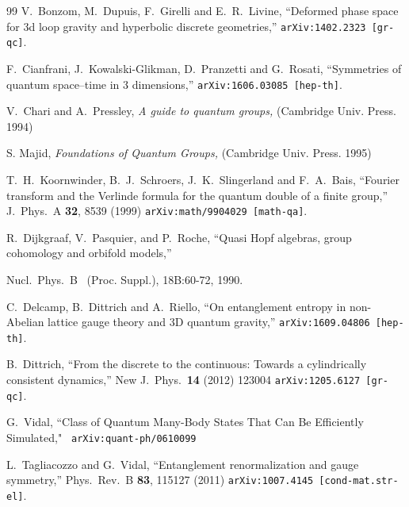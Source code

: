 \documentclass[nofootinbib,superscriptaddress,eqsecnum,tightenlines,11pt]{revtex4-1}
\begin{document}
\begin{thebibliography}{99}
  V.~Bonzom, M.~Dupuis, F.~Girelli and E.~R.~Livine,
  ``Deformed phase space for 3d loop gravity and hyperbolic discrete geometries,''
 \texttt{arXiv:1402.2323 [gr-qc]}.

 F.~Cianfrani, J.~Kowalski-Glikman, D.~Pranzetti and G.~Rosati,
  ``Symmetries of quantum space--time in 3 dimensions,''
  \texttt{arXiv:1606.03085 [hep-th]}.

V.~Chari and A.~Pressley,
  {\it A guide to quantum groups,}
  (Cambridge Univ. Press. 1994)

S. Majid, {\it Foundations of Quantum Groups,}  (Cambridge Univ. Press. 1995)  
  
T.~H.~Koornwinder, B.~J.~Schroers, J.~K.~Slingerland and F.~A.~Bais,
``Fourier transform and the Verlinde formula for the quantum double of a finite group,''
J.\ Phys.\ A {\bf 32}, 8539 (1999)
\texttt{arXiv:math/9904029 [math-qa]}.
  
  
R.~Dijkgraaf, V.~Pasquier, and P.~Roche,
``Quasi Hopf algebras, group cohomology and orbifold models,''

Nucl.\ Phys.\ B \ (Proc. Suppl.), 18B:60-72, 1990.

  C.~Delcamp, B.~Dittrich and A.~Riello,
  ``On entanglement entropy in non-Abelian lattice gauge theory and 3D quantum gravity,''
  \texttt{arXiv:1609.04806 [hep-th]}.

  

 B.~Dittrich,
  ``From the discrete to the continuous: Towards a cylindrically consistent dynamics,''
  New J.\ Phys.\  {\bf 14} (2012) 123004
  \texttt{arXiv:1205.6127 [gr-qc]}.
 
 G.~Vidal,
  ``Class of Quantum Many-Body States That Can Be Efficiently Simulated,"
\texttt{ arXiv:quant-ph/0610099}
 
  L.~Tagliacozzo and G.~Vidal,
  ``Entanglement renormalization and gauge symmetry,''
  Phys.\ Rev.\ B {\bf 83}, 115127 (2011)
  \texttt{arXiv:1007.4145 [cond-mat.str-el]}.
  

\end{thebibliography}
\end{document}
